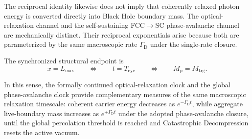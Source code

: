 The reciprocal identity likewise does not imply that coherently relaxed photon energy is converted directly into Black Hole boundary mass. The optical-relaxation channel and the self-sustaining FCC$\rightarrow$SC phase-avalanche channel are mechanically distinct. Their reciprocal exponentials arise because both are parameterized by the same macroscopic rate $\Gamma_{\mathrm{D}}$ under the single-rate closure.

The synchronized structural endpoint is
\begin{equation}
    x=L_{\mathrm{max}}
    \qquad\Longleftrightarrow\qquad
    t=T_{\mathrm{cyc}}
    \qquad\Longleftrightarrow\qquad
    M_{\mathrm{p}}=M_{\mathrm{trg}}.
\end{equation}

In this sense, the formally continued optical-relaxation clock and the global phase-avalanche clock provide complementary measures of the same macroscopic relaxation timescale: coherent carrier energy decreases as $e^{-\Gamma_{\mathrm{D}}t}$, while aggregate live-boundary mass increases as $e^{+\Gamma_{\mathrm{D}}t}$ under the adopted phase-avalanche closure, until the global percolation threshold is reached and Catastrophic Decompression resets the active vacuum.
